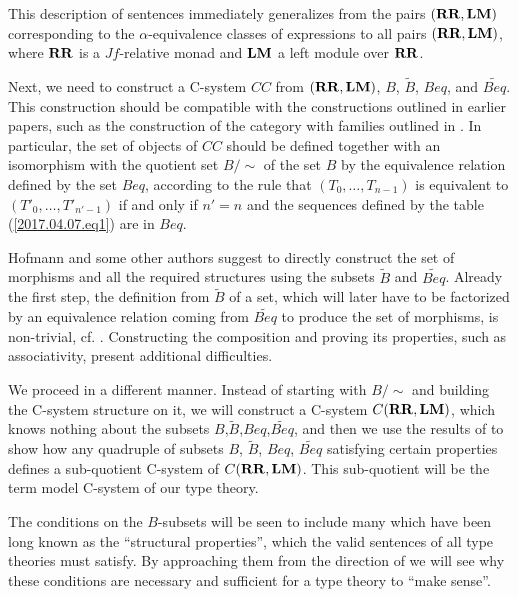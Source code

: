 \documentclass[12pt]{amsart}
\newcommand{\wt}{\widetilde}
\newcommand{\RR}{{\bf RR}}
\newcommand{\LM}{{\bf LM}}
\begin{document}
This description of sentences immediately generalizes from the pairs
$(\RR,\LM)$ corresponding to the $\alpha$-equivalence classes of expressions to
all pairs $(\RR,\LM)$, where $\RR$ is a $Jf$-relative monad and $\LM$ a left
module over $\RR$.


Next, we need to construct a C-system $CC$ from $(\RR,\LM)$, $B$, $\wt{B}$, $Beq$, and
$\wt{Beq}$.  This construction should be compatible with the
constructions outlined in earlier papers, such as the construction of the
category with families outlined in \cite{Hofmann}. In particular, the set of
objects of $CC$ should be defined together with an isomorphism with the quotient
set $B/{\sim}$ of the set $B$ by the equivalence relation defined by the set
$Beq$, according to the rule that $(T_0,\dots,T_{n-1})$ is equivalent to
$(T'_0,\dots,T'_{n'-1})$ if and only if $n'=n$ and the sequences defined by the
table (\ref{2017.04.07.eq1}) are in $Beq$.

Hofmann and some other authors suggest to directly construct the set of
morphisms and all the required structures using the subsets $\wt{B}$ and
$\wt{Beq}$. Already the first step, the definition from $\wt{B}$ of a set, which
will later have to be factorized by an equivalence relation coming from
$\wt{Beq}$ to produce the set of morphisms, is non-trivial, cf.{} \cite[Def. 2.11,
  p.~97]{Hofmann}. Constructing the composition and proving its properties, such
as associativity, present additional difficulties.

We proceed in a different manner. Instead of starting with $B/{\sim}$ and
building the C-system structure on it, we will construct a C-system
$C(\RR,\LM)$, which knows nothing about the subsets
$B$,$\wt{B}$,$Beq$,$\wt{Beq}$, and then we use the results of \cite{Csubsystems}
to show how any quadruple of subsets $B$, $\wt{B}$, $Beq$, $\wt{Beq}$ satisfying
certain properties defines a sub-quotient C-system of $C(\RR,\LM)$. This
sub-quotient will be the term model C-system of our type theory.

The conditions on the $B$-subsets will be seen to include many
which have been long known as the ``structural properties'', which the valid
sentences of all type theories must satisfy. By approaching them from the
direction of \cite{Csubsystems} we will see why these conditions are
necessary and sufficient for a type theory to ``make sense''.
\end{document}
